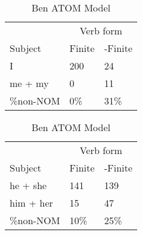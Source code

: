 \begin{table}[]
\caption{Ben ATOM Model}
\begin{minipage}{0.5\textwidth}
    \centering
    \begin{tabular}{@{}lll@{}}
        \toprule
         & \multicolumn{2}{c}{Verb form}\\
         \cline{2-3}
        Subject & Finite & -Finite \\
        \midrule
        I & 200 & 24 \\
        me + my & 0 & 11 \\
        \hline
        \%non-NOM & 0\% & 31\% \\
        \bottomrule
    \end{tabular}
\end{minipage}
\begin{minipage}{0.5\textwidth}
    \centering
    \begin{tabular}{@{}lll@{}}
        \toprule
         & \multicolumn{2}{c}{Verb form}\\
         \cline{2-3}
        Subject & Finite & -Finite \\
        \midrule
        he + she & 141 & 139 \\
        him + her & 15 & 47 \\
        \hline
        \%non-NOM & 10\% & 25\% \\
        \bottomrule
    \end{tabular}
    \end{minipage}


\end{table}
